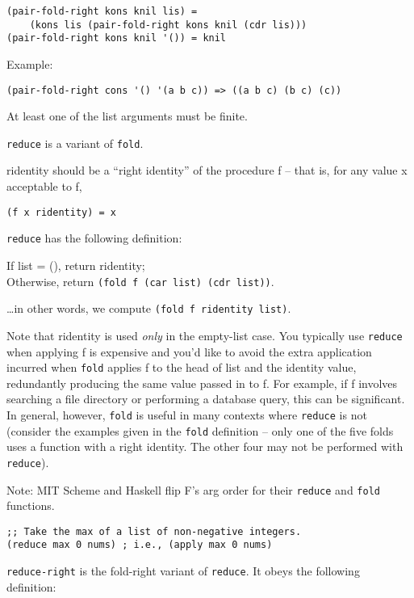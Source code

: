 \begin{description}
\begin{verbatim}
(pair-fold-right kons knil lis) = 
    (kons lis (pair-fold-right kons knil (cdr lis)))
(pair-fold-right kons knil '()) = knil
\end{verbatim}

Example:

\begin{verbatim}
(pair-fold-right cons '() '(a b c)) => ((a b c) (b c) (c))
\end{verbatim}

At least one of the list arguments must be finite.
\item[ \href{}{} \texttt{reduce} f ridentity list -\textgreater{} value
]
\texttt{reduce} is a variant of \texttt{fold}.

ridentity should be a ``right identity'' of the procedure f -- that is,
for any value x acceptable to f,

\begin{verbatim}
(f x ridentity) = x
\end{verbatim}

\texttt{reduce} has the following definition:

If list = (), return ridentity;\\
Otherwise, return \texttt{(fold\ f\ (car\ list)\ (cdr\ list))}.

\ldots{}in other words, we compute \texttt{(fold\ f\ ridentity\ list)}.

Note that ridentity is used \emph{only} in the empty-list case. You
typically use \texttt{reduce} when applying f is expensive and you'd
like to avoid the extra application incurred when \texttt{fold} applies
f to the head of list and the identity value, redundantly producing the
same value passed in to f. For example, if f involves searching a file
directory or performing a database query, this can be significant. In
general, however, \texttt{fold} is useful in many contexts where
\texttt{reduce} is not (consider the examples given in the \texttt{fold}
definition -- only one of the five folds uses a function with a right
identity. The other four may not be performed with \texttt{reduce}).

Note: MIT Scheme and Haskell flip F's arg order for their
\texttt{reduce} and \texttt{fold} functions.

\begin{verbatim}
;; Take the max of a list of non-negative integers.
(reduce max 0 nums) ; i.e., (apply max 0 nums)
\end{verbatim}
\item[ \href{}{} \texttt{reduce-right} f ridentity list -\textgreater{}
value ]
\texttt{reduce-right} is the fold-right variant of \texttt{reduce}. It
obeys the following definition:


\end{description}
